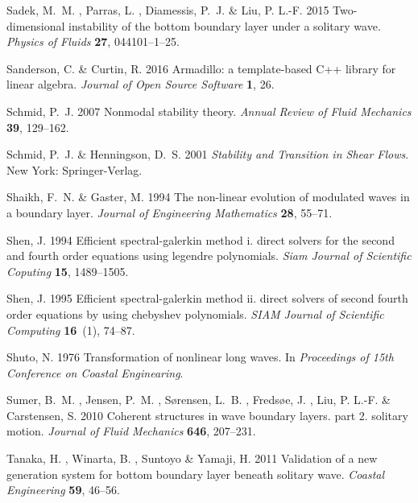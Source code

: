 \documentclass{jfm}
\begin{document}
\begin{thebibliography}{45}
{\sc Sadek, M.~M. , Parras, L. , Diamessis, P.~J.  \& Liu, P. L.-F. } 2015
  Two-dimensional instability of the bottom boundary layer under a solitary
  wave. {\em Physics of Fluids\/} {\bf 27}, 044101--1--25.

{\sc Sanderson, C.  \& Curtin, R. } 2016 Armadillo: a template-based {C}++
  library for linear algebra. {\em Journal of Open Source Software\/} {\bf 1},
  26.

{\sc Schmid, P.~J. } 2007 Nonmodal stability theory. {\em Annual Review of
  Fluid Mechanics\/} {\bf 39}, 129--162.

{\sc Schmid, P.~J.  \& Henningson, D.~S. } 2001 {\em Stability and Transition
  in Shear Flows\/}. New York: Springer-Verlag.

{\sc Shaikh, F.~N.  \& Gaster, M. } 1994 The non-linear evolution of modulated
  waves in a boundary layer. {\em Journal of Engineering Mathematics\/} {\bf
  28}, 55--71.

{\sc Shen, J. } 1994 Efficient spectral-galerkin method i. direct solvers for
  the second and fourth order equations using legendre polynomials. {\em Siam
  Journal of Scientific Coputing\/} {\bf 15}, 1489--1505.

{\sc Shen, J. } 1995 Efficient spectral-galerkin method ii. direct solvers of
  second fourth order equations by using chebyshev polynomials. {\em SIAM
  Journal of Scientific Computing\/} {\bf 16}~(1), 74--87.

{\sc Shuto, N. } 1976 Transformation of nonlinear long waves. In {\em
  Proceedings of 15th Conference on Coastal Enginearing\/}.

{\sc Sumer, B.~M. , Jensen, P.~M. , S{\o}rensen, L.~B. , Freds{\o}e, J. , Liu,
  P. L.-F.  \& Carstensen, S. } 2010 Coherent structures in wave boundary
  layers. part 2. solitary motion. {\em Journal of Fluid Mechanics\/} {\bf
  646}, 207--231.

{\sc Tanaka, H. , Winarta, B. , Suntoyo \& Yamaji, H. } 2011 Validation of a
  new generation system for bottom boundary layer beneath solitary wave. {\em
  Coastal Engineering\/} {\bf 59}, 46--56.


\end{thebibliography}
\end{document}
